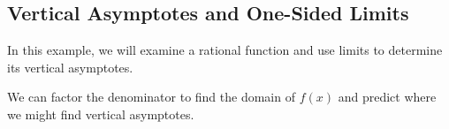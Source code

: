 \begin{maplegroup}
\begin{mapleinput}
\end{mapleinput}
\mapleresult
\begin{maplelatex}
\end{maplelatex}
\end{maplegroup}

\begin{maplegroup}
\begin{mapleinput}
\end{mapleinput}
\end{maplegroup}

\subsection{Vertical Asymptotes and One-Sided Limits}
\label{subsec:vertical_asymptotes}

In this example, we will examine a rational function and use limits to determine its vertical asymptotes.

\begin{maplegroup}
\begin{mapleinput}
\end{mapleinput}
\mapleresult
\begin{maplelatex}
\end{maplelatex}
\end{maplegroup}

\noindent
We can factor the denominator to find the domain of $f(x)$ and predict where we might find vertical asymptotes.

\begin{maplegroup}
\begin{mapleinput}
\end{mapleinput}
\mapleresult
\begin{maplelatex}
\end{maplelatex}
\end{maplegroup}


